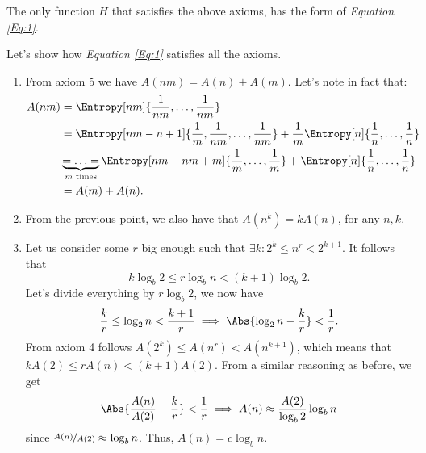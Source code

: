 \documentclass{subfiles}
\begin{document}
    \begin{theorem*}
        The only function \(H\) that satisfies the above axioms,
        has the form of \emph{Equation \eqref{Eq:1}}.
    \end{theorem*}
    \begin{proof*}
        Let's show how \emph{Equation \eqref{Eq:1}} satisfies all the axioms.
        \begin{enumerate}
            \item From axiom 5 we have \(A(nm) = A(n) + A(m)\).
                Let's note in fact that: 
                \[\begin{aligned}
                    A(nm) & = \Entropy[nm]{\frac{1}{nm}, \ldots, \frac{1}{nm}} \\ 
                        & = \Entropy[nm - n + 1]{
                            \frac{1}{m}, \frac{1}{nm}, \ldots, \frac{1}{nm} 
                        } + \frac{1}{m} \Entropy[n]{
                            \frac{1}{n}, \ldots, \frac{1}{n}
                        } \\
                        & \underbrace{ = \ldots = }_{m \text{ times}} \Entropy[nm -nm + m]{
                            \frac{1}{m}, \ldots, \frac{1}{m}
                        } + \Entropy[n]{ \frac{1}{n}, \ldots, \frac{1}{n}} \\ 
                    & = A(m) + A(n).
                \end{aligned}\]
            \item From the previous point, 
                we also have that \(A(n^{k}) = k A(n)\), for any \(n, k\).

            \item Let us consider some \(r\) big enough such that 
                \(\exists k : 2^{k} \le n^{r} < 2^{k + 1}\).
                It follows that 
                \[
                    k \log_{b} 2 \le r \log_{b} n < (k + 1) \log_{b} 2.
                \]
                Let's divide everything by \(r \log_{b} 2\), we now have 
                \[
                    \frac{k}{r} \le \log_{2} n < \frac{k + 1}{r} 
                        \implies \Abs{\log_{2} n - \frac{k}{r}} < \frac{1}{r}.
                \]
                From axiom 4 follows \(A(2^{k}) \le A(n^{r}) < A(n^{k + 1})\),
                which means that \(k A(2) \le r A(n) < (k + 1)A(2)\).
                From a similar reasoning as before, we get 
                \[
                    \Abs{\frac{A(n)}{A(2)} - \frac{k}{r}} < \frac{1}{r}
                        \implies A(n) \approx \frac{A(2)}{\log_{b} 2} \log_{b} n
                \]
                since \(\nicefrac{A(n)}{A(2)} \approx \log_{b} n\).
                Thus, \(A(n) = c \log_{b} n\).


\end{enumerate}
\end{proof*}
\end{document}
